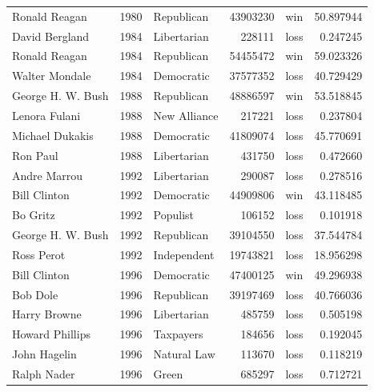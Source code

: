 \documentclass[
  letterpaper,
  DIV=11,
  numbers=noendperiod]{scrreprt}
\begin{document}
\begin{tabular}{lrlrlr}
Ronald Reagan          &  1980 &             Republican &      43903230 &    win &  50.897944 \\
David Bergland         &  1984 &            Libertarian &        228111 &   loss &   0.247245 \\
Ronald Reagan          &  1984 &             Republican &      54455472 &    win &  59.023326 \\
Walter Mondale         &  1984 &             Democratic &      37577352 &   loss &  40.729429 \\
George H. W. Bush      &  1988 &             Republican &      48886597 &    win &  53.518845 \\
Lenora Fulani          &  1988 &           New Alliance &        217221 &   loss &   0.237804 \\
Michael Dukakis        &  1988 &             Democratic &      41809074 &   loss &  45.770691 \\
Ron Paul               &  1988 &            Libertarian &        431750 &   loss &   0.472660 \\
Andre Marrou           &  1992 &            Libertarian &        290087 &   loss &   0.278516 \\
Bill Clinton           &  1992 &             Democratic &      44909806 &    win &  43.118485 \\
Bo Gritz               &  1992 &               Populist &        106152 &   loss &   0.101918 \\
George H. W. Bush      &  1992 &             Republican &      39104550 &   loss &  37.544784 \\
Ross Perot             &  1992 &            Independent &      19743821 &   loss &  18.956298 \\
Bill Clinton           &  1996 &             Democratic &      47400125 &    win &  49.296938 \\
Bob Dole               &  1996 &             Republican &      39197469 &   loss &  40.766036 \\
Harry Browne           &  1996 &            Libertarian &        485759 &   loss &   0.505198 \\
Howard Phillips        &  1996 &              Taxpayers &        184656 &   loss &   0.192045 \\
John Hagelin           &  1996 &            Natural Law &        113670 &   loss &   0.118219 \\
Ralph Nader            &  1996 &                  Green &        685297 &   loss &   0.712721 \\

\end{tabular}
\end{document}
